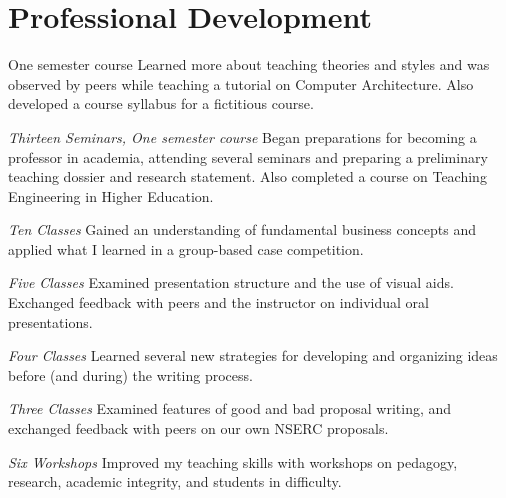 \section{\sc Professional Development}

{One semester course}{ }
{
  Learned more about teaching theories and styles and was observed by peers while teaching a tutorial on Computer Architecture.
  Also developed a course syllabus for a fictitious course.
}

{\em Thirteen Seminars, One semester course}{ }
{
  Began preparations for becoming a professor in academia, attending several seminars and preparing a preliminary teaching dossier and research statement.
  Also completed a course on Teaching Engineering in Higher Education.
}

{\em Ten Classes}{ }
{
  Gained an understanding of fundamental business concepts and applied what I learned in a group-based case competition.
}

{\em Five Classes}{ }
{
  Examined presentation structure and the use of visual aids.
  Exchanged feedback with peers and the instructor on individual oral presentations.
}

{\em Four Classes}{ }
{
  Learned several new strategies for developing and organizing ideas before (and during) the writing process.
}

{\em Three Classes}{ }
{
  Examined features of good and bad proposal writing, and exchanged feedback with peers on our own NSERC proposals.
}

{\em Six Workshops}{ }
{
  Improved my teaching skills with workshops on pedagogy, research, academic integrity, and students in difficulty.
}

